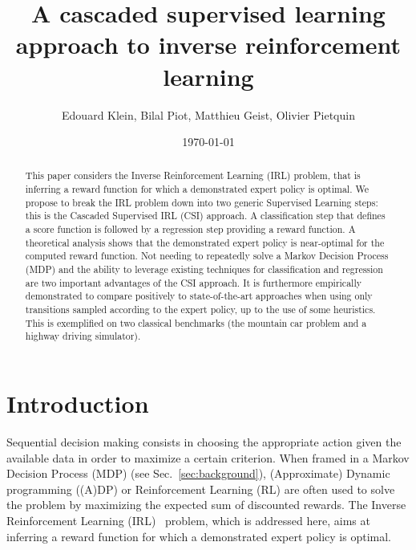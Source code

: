 \documentclass{llncs}
\begin{document}
\title{A cascaded supervised learning approach to inverse reinforcement learning}
\author{Edouard Klein, Bilal Piot, Matthieu Geist, Olivier Pietquin}



\date{\today}


\maketitle

\begin{abstract}
  This paper considers the Inverse Reinforcement Learning (IRL) problem, that is inferring a reward function for which a demonstrated expert policy is optimal.
We propose to break the IRL problem down into two generic Supervised Learning steps: this is the Cascaded Supervised IRL (CSI) approach. A classification step that defines a score function is followed by a regression step providing a reward function.
A theoretical analysis shows that the demonstrated expert policy is near-optimal for the computed reward function.
Not needing to repeatedly solve a Markov Decision Process (MDP) and the ability to leverage existing techniques for classification and regression are two important advantages of the CSI approach. It is furthermore empirically demonstrated to compare positively to state-of-the-art approaches when using only transitions sampled according to the expert policy, up to the use of some heuristics. This is exemplified on two classical benchmarks (the mountain car problem and a highway driving simulator).
  \end{abstract}
\section{Introduction}
\label{sec-2}
Sequential decision making consists in choosing the appropriate action given the available data in order to maximize a certain criterion. When framed in a Markov Decision Process (MDP) (see Sec.~\ref{sec:background}), (Approximate) Dynamic programming ((A)DP) or Reinforcement Learning (RL) are often used to solve the problem by maximizing the expected sum of discounted rewards. The Inverse Reinforcement Learning (IRL)~\cite{russell1998learning} problem, which is addressed here, aims at inferring a reward function for which a demonstrated expert policy is optimal.
\end{document}
